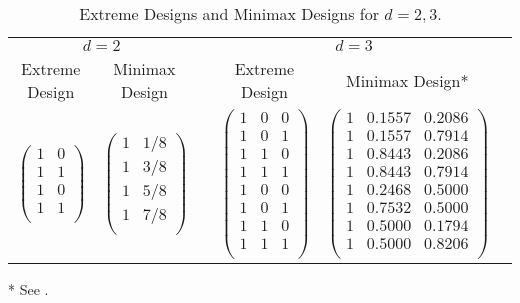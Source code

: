 \documentclass[ijoc,nonblindrev]{informs3}
\begin{document}
\begin{table}[p]
\caption{Extreme Designs and Minimax Designs for $d=2,3$.} \label{tab-designs}
\centering
\small
\begin{tabular}{cccccc}
\toprule
 \multicolumn{2}{c}{$d=2$} & & \multicolumn{2}{c}{$d=3$} \\
\cmidrule(lr){1-2} \cmidrule(lr){4-5}
 Extreme Design & Minimax Design & & Extreme Design & Minimax Design* \\ %
\midrule
$ \left( \begin{array}{cc} 1 & 0 \\ 1 & 1 \\ 1 & 0 \\ 1 & 1 \\ \end{array} \right)$
&
$ \left( \begin{array}{cc} 1 & 1/8 \\ 1 & 3/8 \\ 1 & 5/8 \\ 1 & 7/8 \\ \end{array} \right)$
& &
$ \left( \begin{array}{ccc} 1 & 0 & 0 \\ 1 & 0 & 1\\ 1 & 1 & 0\\ 1 & 1 & 1\\ 1 & 0 & 0 \\ 1 & 0 & 1\\ 1 & 1 & 0\\ 1 & 1 & 1\\ \end{array} \right)$
&
$ \left( \begin{array}{ccc} 1 & 0.1557 & 0.2086 \\ 1 & 0.1557 & 0.7914 \\ 1 & 0.8443 & 0.2086\\ 1 & 0.8443 & 0.7914\\
                            1 & 0.2468 & 0.5000 \\ 1 & 0.7532 & 0.5000 \\ 1 & 0.5000 & 0.1794\\ 1 & 0.5000 & 0.8206\\ \end{array} \right)$
\\
\bottomrule
\end{tabular}
\begin{minipage}[t]{0.73\linewidth}
\SingleSpacedXI
\vspace{0.6em}
\footnotesize{
\textsf{* See \cite{melissen1996improved}.}
}
\end{minipage}
\end{table}
\end{document}
